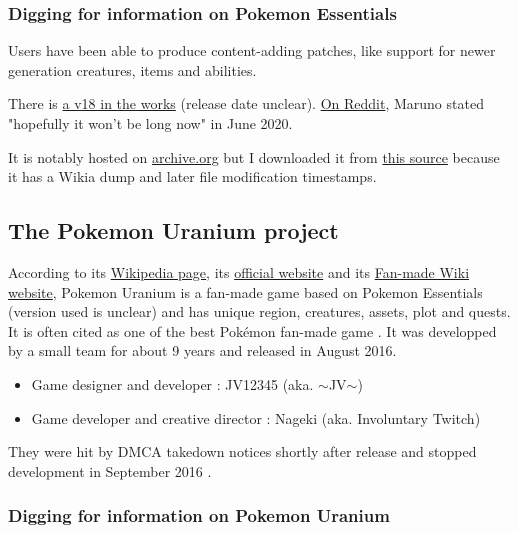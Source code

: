 \documentclass[11pt]{article}
\begin{document}
\subsubsection{Digging for information on Pokemon Essentials}

Users have been able to produce content-adding patches, like support for newer generation creatures, items and abilities.

There is \href{https://www.reddit.com/r/PokemonRMXP/comments/ckeaov/pok\%C3\%A9mon\_essentials\_v18\_progress\_report/}{a v18 in the works} (release date unclear). \href{https://www.reddit.com/r/PokemonRMXP/comments/hb6i6m/should\_i\_wait\_for\_essentials\_v18/}{On Reddit}, Maruno stated "hopefully it won't be long now" in June 2020.

It is notably hosted on  \href{https://archive.org/details/PokmonEssentialsV17.220171015}{archive.org} but I downloaded it from \href{https://mega.nz/file/HPQDCIaY#Ie9LcVXeFgiLElIFmyx9uv6lwuyw8P-1REEoqnW7USs}{this source} because it has a Wikia dump and later file modification timestamps.





\subsection{The Pokemon Uranium project}


According to its \href{https://en.wikipedia.org/wiki/Pok\%C3\%A9mon_Uranium}{Wikipedia page}, its \href{http://pokemonuranium.org/}{official website} and its \href{https://pokemon-uranium.fandom.com/wiki/Main_Page}{Fan-made Wiki website}, Pokemon Uranium is a fan-made game based on Pokemon Essentials (version used is unclear) and has unique region, creatures, assets, plot and quests. It is often cited as one of the best Pokémon fan-made game \cite{PkmnBestFG, PkmnBestFG2}.
It was developped by a small team for about 9 years and released in August 2016.
\begin{itemize}
	\item Game designer and developer : JV12345 (aka. $\sim$JV$\sim$)
	\item Game developer and creative director : Nageki (aka. Involuntary Twitch)
\end{itemize}
They were hit by DMCA takedown notices shortly after release and stopped development in September 2016 \cite{PUtakedown}.


\subsubsection{Digging for information on Pokemon Uranium}
\end{document}
